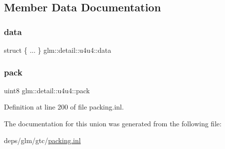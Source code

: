 \subsection{Member Data Documentation}
\mbox{\label{unionglm_1_1detail_1_1u4u4_a48ec3d00452dbe6118fb2f5de7860b48}} 
\subsubsection{\texorpdfstring{data}{data}}
{\footnotesize\ttfamily struct \{ ... \}   glm\+::detail\+::u4u4\+::data}

\mbox{\label{unionglm_1_1detail_1_1u4u4_a823a2e3d7ae6e4710c0ceb40e191ef7b}} 
\subsubsection{\texorpdfstring{pack}{pack}}
{\footnotesize\ttfamily uint8 glm\+::detail\+::u4u4\+::pack}



Definition at line 200 of file packing.\+inl.



The documentation for this union was generated from the following file\+:\begin{DoxyCompactItemize}
\item 
deps/glm/gtc/\hyperlink{packing_8inl}{packing.\+inl}\end{DoxyCompactItemize}
